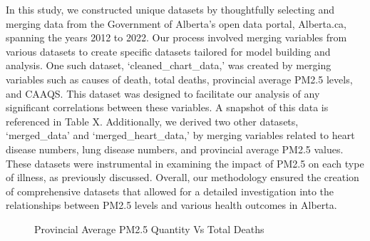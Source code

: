 \documentclass[
  letterpaper,
  DIV=11,
  numbers=noendperiod]{scrartcl}
\begin{document}
In this study, we constructed unique datasets by thoughtfully selecting
and merging data from the Government of Alberta's open data portal,
Alberta.ca, spanning the years 2012 to 2022. Our process involved
merging variables from various datasets to create specific datasets
tailored for model building and analysis. One such dataset,
`cleaned\_chart\_data,' was created by merging variables such as causes
of death, total deaths, provincial average PM2.5 levels, and CAAQS. This
dataset was designed to facilitate our analysis of any significant
correlations between these variables. A snapshot of this data is
referenced in Table X. Additionally, we derived two other datasets,
`merged\_data' and `merged\_heart\_data,' by merging variables related
to heart disease numbers, lung disease numbers, and provincial average
PM2.5 values. These datasets were instrumental in examining the impact
of PM2.5 on each type of illness, as previously discussed. Overall, our
methodology ensured the creation of comprehensive datasets that allowed
for a detailed investigation into the relationships between PM2.5 levels
and various health outcomes in Alberta.

\begin{figure}


\caption{\label{fig-all}Provincial Average PM2.5 Quantity Vs Total
Deaths}

\end{figure}%
\end{document}
